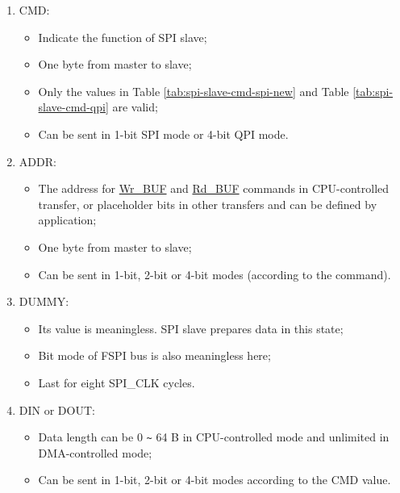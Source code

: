 \documentclass[main\_\_EN.tex]{subfiles}
\begin{document}
\begin{enumerate}
   \item CMD:
        \begin{itemize}
            \item Indicate the function of SPI slave;
            \item One byte from master to slave;
            \item Only the values in Table \ref{tab:spi-slave-cmd-spi-new} and Table \ref{tab:spi-slave-cmd-qpi} are valid;
            \item Can be sent in 1-bit SPI mode or 4-bit QPI mode.
        \end{itemize}

   \item ADDR:
        \begin{itemize}
            \item The address for \hyperlink{cmd:wrbuf}{Wr\_BUF} and \hyperlink{cmd:rdbuf}{Rd\_BUF} commands in CPU-controlled transfer, or placeholder bits in other transfers and can be defined by application;
            \item One byte from master to slave;
            \item Can be sent in 1-bit, 2-bit or 4-bit modes (according to the command).
        \end{itemize}

   \item DUMMY:
        \begin{itemize}
            \item Its value is meaningless. SPI slave prepares data in this state;
            \item Bit mode of FSPI bus is also meaningless here;
            \item Last for eight SPI\_CLK cycles.
        \end{itemize}

   \item DIN or DOUT:

        \begin{itemize}
            \item Data length can be 0 \verb+~+ 64 B in CPU-controlled mode and unlimited in DMA-controlled mode;
            \item Can be sent in 1-bit, 2-bit or 4-bit modes according to the CMD value.
        \end{itemize}

   \end{enumerate}
\end{document}
